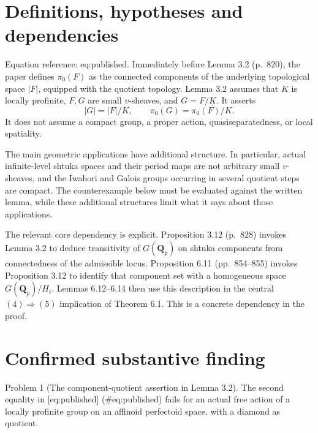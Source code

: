 \documentclass[10pt]{article}
\begin{document}
\section*{Definitions, hypotheses and dependencies}
Equation reference: eq:published. Immediately before Lemma 3.2 (p. 820), the paper defines \(\pi_0(F)\) as the connected components of the underlying topological space \(|F|\), equipped with the quotient topology. Lemma 3.2 assumes that \(K\) is locally profinite, \(F,G\) are small \(v\)-sheaves, and \(G=F/\underline K\). It asserts \[
 |G|=|F|/K,\qquad \pi_0(G)=\pi_0(F)/K.\] It does not assume a compact group, a proper action, quasiseparatedness, or local spatiality.\par
The main geometric applications have additional structure. In particular, actual infinite-level shtuka spaces and their period maps are not arbitrary small \(v\)-sheaves, and the Iwahori and Galois groups occurring in several quotient steps are compact. The counterexample below must be evaluated against the written lemma, while these additional structures limit what it says about those applications.\par
The relevant core dependency is explicit. Proposition 3.12 (p. 828) invokes Lemma 3.2 to deduce transitivity of \(G(\mathbf Q_p)\) on shtuka components from connectedness of the admissible locus. Proposition 6.11 (pp. 854–855) invokes Proposition 3.12 to identify that component set with a homogeneous space \(G(\mathbf Q_p)/H_t\). Lemmas 6.12–6.14 then use this description in the central \((4)\Rightarrow(5)\) implication of Theorem 6.1. This is a concrete dependency in the proof.\par
\section*{Confirmed substantive finding}
Problem 1 (The component-quotient assertion in Lemma 3.2).  The second equality in [eq:published] (\#eq:published) fails for an actual free action of a locally profinite group on an affinoid perfectoid space, with a diamond as quotient.\par
\end{document}
